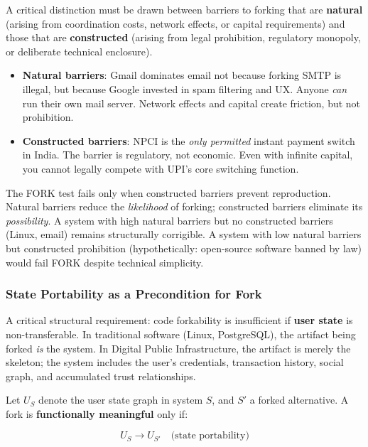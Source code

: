 A critical distinction must be drawn between barriers to forking that are \textbf{natural} (arising from coordination costs, network effects, or capital requirements) and those that are \textbf{constructed} (arising from legal prohibition, regulatory monopoly, or deliberate technical enclosure).

\begin{itemize}
    \item \textbf{Natural barriers}: Gmail dominates email not because forking SMTP is illegal, but because Google invested in spam filtering and UX. Anyone \textit{can} run their own mail server. Network effects and capital create friction, but not prohibition.
    \item \textbf{Constructed barriers}: NPCI is the \textit{only permitted} instant payment switch in India. The barrier is regulatory, not economic. Even with infinite capital, you cannot legally compete with UPI's core switching function.
\end{itemize}

The FORK test fails only when constructed barriers prevent reproduction. Natural barriers reduce the \textit{likelihood} of forking; constructed barriers eliminate its \textit{possibility}. A system with high natural barriers but no constructed barriers (Linux, email) remains structurally corrigible. A system with low natural barriers but constructed prohibition (hypothetically: open-source software banned by law) would fail FORK despite technical simplicity.

\subsubsection{State Portability as a Precondition for Fork}

A critical structural requirement: code forkability is insufficient if \textbf{user state} is non-transferable. In traditional software (Linux, PostgreSQL), the artifact being forked \textit{is} the system. In Digital Public Infrastructure, the artifact is merely the skeleton; the system includes the user's credentials, transaction history, social graph, and accumulated trust relationships.

Let $U_S$ denote the user state graph in system $S$, and $S'$ a forked alternative. A fork is \textbf{functionally meaningful} only if:

\begin{equation}
U_S \to U_{S'} \quad \text{(state portability)}
\label{eq:state-portability}
\end{equation}

